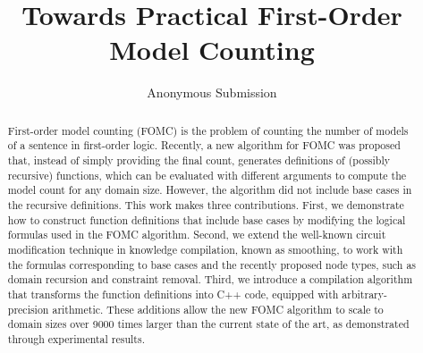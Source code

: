 \documentclass[letterpaper]{article} %
\title{Towards Practical First-Order Model Counting}
\author{Anonymous Submission}
\theoremstyle{remark}
\theoremstyle{definition}
\begin{document}
\maketitle

\begin{abstract}
  First-order model counting (FOMC) is the problem of counting the number of
  models of a sentence in first-order logic. Recently, a new algorithm for FOMC
  was proposed that, instead of simply providing the final count, generates
  definitions of (possibly recursive) functions, which can be evaluated with
  different arguments to compute the model count for any domain size. However,
  the algorithm did not include base cases in the recursive definitions. This
  work makes three contributions. First, we demonstrate how to construct
  function definitions that include base cases by modifying the logical formulas
  used in the FOMC algorithm. Second, we extend the well-known circuit
  modification technique in knowledge compilation, known as smoothing, to work
  with the formulas corresponding to base cases and the recently proposed node
  types, such as domain recursion and constraint removal. Third, we introduce a
  compilation algorithm that transforms the function definitions into C++ code,
  equipped with arbitrary-precision arithmetic. These additions allow the new
  FOMC algorithm to scale to domain sizes over \num{9000} times larger than the
  current state of the art, as demonstrated through experimental results.
\end{abstract}




\end{document}
